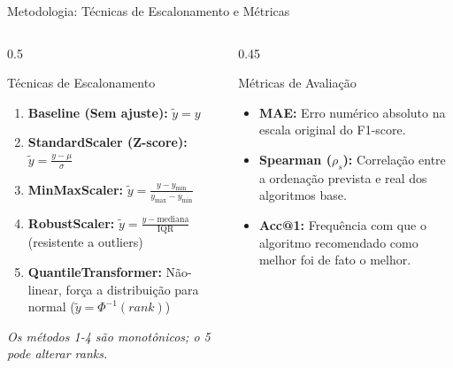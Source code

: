 \documentclass[aspectratio=169, 10pt]{beamer}
\begin{document}
\begin{frame}{Metodologia: Técnicas de Escalonamento e Métricas}
  \begin{columns}[T]
    \begin{column}{0.5\textwidth}
      \begin{block}{Técnicas de Escalonamento}
        \small
        \begin{enumerate}
          \item \textbf{Baseline (Sem ajuste):} $\tilde{y} = y$
          \item \textbf{StandardScaler (Z-score):} $\tilde{y} = \frac{y - \mu}{\sigma}$
          \item \textbf{MinMaxScaler:} $\tilde{y} = \frac{y - y_{\min}}{y_{\max} - y_{\min}}$
          \item \textbf{RobustScaler:} $\tilde{y} = \frac{y - \text{mediana}}{\text{IQR}}$ (resistente a outliers)
          \item \textbf{QuantileTransformer:} Não-linear, força a distribuição para normal ($\tilde{y} = \Phi^{-1}(rank)$)
        \end{enumerate}
        \textit{Os métodos 1-4 são monotônicos; o 5 pode alterar ranks.}
      \end{block}
    \end{column}
    
    \begin{column}{0.45\textwidth}
      \begin{block}{Métricas de Avaliação}
        \small
        \begin{itemize}
          \item \textbf{MAE:} Erro numérico absoluto na escala original do F1-score.
          \item \textbf{Spearman ($\rho_s$):} Correlação entre a ordenação prevista e real dos algoritmos base.
          \item \textbf{Acc@1:} Frequência com que o algoritmo recomendado como melhor foi de fato o melhor.
        \end{itemize}
      \end{block}
    \end{column}
  \end{columns}
\end{frame}
\end{document}
